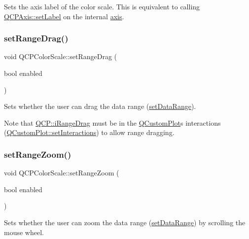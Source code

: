 Sets the axis label of the color scale. This is equivalent to calling \mbox{\hyperlink{class_q_c_p_axis_a33bcc382c111c9f31bb0687352a2dea4}{Q\+C\+P\+Axis\+::set\+Label}} on the internal \mbox{\hyperlink{class_q_c_p_color_scale_a39bdbdb3b212602a5a57f9f3ea444190}{axis}}. \mbox{\label{class_q_c_p_color_scale_a21c51a55e4fd581b6feadca9ee5b38d5}} 
\subsubsection{\texorpdfstring{setRangeDrag()}{setRangeDrag()}}
{\footnotesize\ttfamily void Q\+C\+P\+Color\+Scale\+::set\+Range\+Drag (\begin{DoxyParamCaption}\item[{bool}]{enabled }\end{DoxyParamCaption})}

Sets whether the user can drag the data range (\mbox{\hyperlink{class_q_c_p_color_scale_abe88633003a26d1e756aa74984587fef}{set\+Data\+Range}}).

Note that \mbox{\hyperlink{namespace_q_c_p_a2ad6bb6281c7c2d593d4277b44c2b037a2c4432b9aceafb94000be8d1b589ef18}{Q\+C\+P\+::i\+Range\+Drag}} must be in the \mbox{\hyperlink{class_q_custom_plot}{Q\+Custom\+Plot}}\textquotesingle{}s interactions (\mbox{\hyperlink{class_q_custom_plot_a5ee1e2f6ae27419deca53e75907c27e5}{Q\+Custom\+Plot\+::set\+Interactions}}) to allow range dragging. \mbox{\label{class_q_c_p_color_scale_a96bd60fb6317ad6821841b539c93eeeb}} 
\subsubsection{\texorpdfstring{setRangeZoom()}{setRangeZoom()}}
{\footnotesize\ttfamily void Q\+C\+P\+Color\+Scale\+::set\+Range\+Zoom (\begin{DoxyParamCaption}\item[{bool}]{enabled }\end{DoxyParamCaption})}

Sets whether the user can zoom the data range (\mbox{\hyperlink{class_q_c_p_color_scale_abe88633003a26d1e756aa74984587fef}{set\+Data\+Range}}) by scrolling the mouse wheel.

